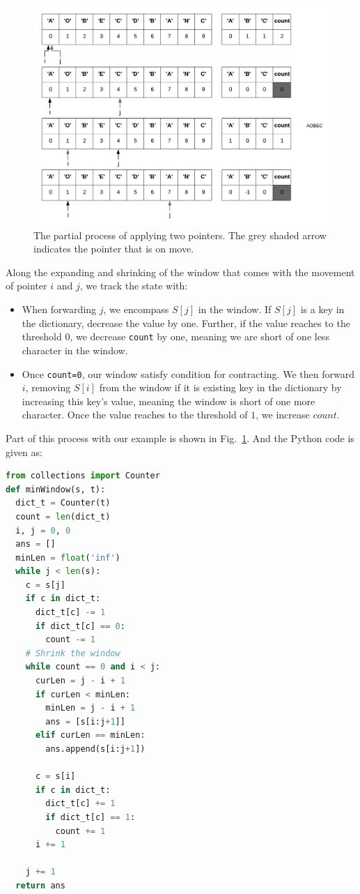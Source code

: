 \documentclass[../main.tex]{subfiles}
\begin{document}
\begin{figure}[h!]
    \centering
    \includegraphics[width=1.1\columnwidth]{fig/minimum_window_substring_process.png}
    \caption{The partial process of applying two pointers. The grey shaded arrow indicates the pointer that is on move.}
    \label{fig:minimum_window_process}
\end{figure}

Along the expanding and shrinking of the window that comes with the movement of pointer $i$ and $j$, we track the state with:
\begin{itemize}
    \item When forwarding $j$, we encompass $S[j]$ in the window. If $S[j]$ is a key in the dictionary, decrease the value by one. Further, if the value reaches to the threshold $0$, we decrease \texttt{count} by one, meaning we are short of one less character in the window.
    \item Once \texttt{count=0}, our window satisfy condition for contracting. We then forward $i$, removing $S[i]$ from the window if it is existing key in the dictionary by increasing this key's value, meaning the window is short of one more character. Once the value reaches to the threshold of $1$, we increase $count$. 
\end{itemize}
Part of this process with our example is shown in Fig.~\ref{fig:minimum_window_process}. And the Python code is given as:
\begin{lstlisting}[language=Python]
from collections import Counter
def minWindow(s, t):
  dict_t = Counter(t)
  count = len(dict_t)
  i, j = 0, 0
  ans = []
  minLen = float('inf')
  while j < len(s):
    c = s[j]
    if c in dict_t:
      dict_t[c] -= 1
      if dict_t[c] == 0:
        count -= 1
    # Shrink the window
    while count == 0 and i < j:
      curLen = j - i + 1
      if curLen < minLen:
        minLen = j - i + 1
        ans = [s[i:j+1]]
      elif curLen == minLen: 
        ans.append(s[i:j+1])

      c = s[i]
      if c in dict_t:
        dict_t[c] += 1
        if dict_t[c] == 1:
          count += 1
      i += 1

    j += 1
  return ans
\end{lstlisting}
\end{document}
